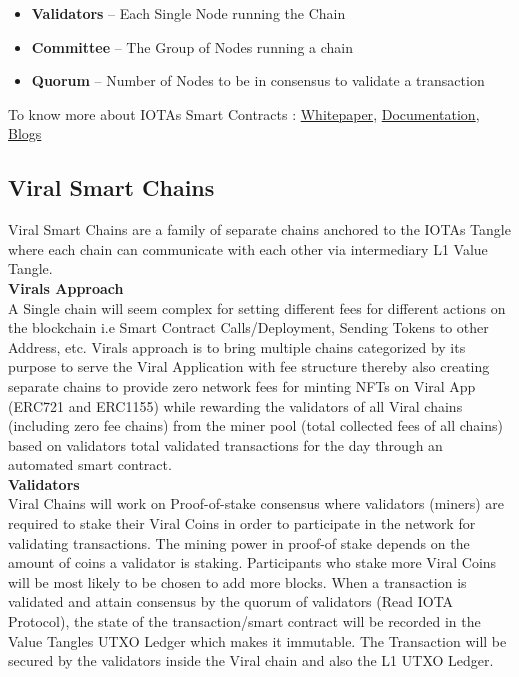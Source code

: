 \documentclass[10pt]{article}
\begin{document}
\begin{itemize}[leftmargin=+0.2in]
\item \textbf{Validators} – Each Single Node running the Chain
\item \textbf{Committee} – The Group of Nodes running a chain
\item \textbf{Quorum} – Number of Nodes to be in consensus to validate a transaction
\end{itemize}

To know more about IOTA\textsc{}s Smart Contracts : \hyperlink{https://files.iota.org/papers/ISC_WP_Nov_10_2021.pdf}{Whitepaper}, \hyperlink{https://wiki.iota.org/smart-contracts/overview}{Documentation}, \hyperlink{https://blog.iota.org/iota-smart-contracts-beta-release/}{Blogs}\\

\subsection{Viral Smart Chains}

Viral Smart Chains are a family of separate chains anchored to the IOTA\textsc{}s Tangle where each chain can communicate with each other via intermediary L1 Value Tangle.\\

\textbf{Viral\textsc{}s Approach}\\

A Single chain will seem complex for setting different fees for different actions on the blockchain i.e Smart Contract Calls/Deployment, Sending Tokens to other Address, etc. Viral\textsc{}s approach is to bring multiple chains categorized by its purpose to serve the Viral Application with fee structure thereby also creating separate chains to provide zero network fees for minting NFTs on Viral App (ERC721 and ERC1155) while rewarding the validators of all Viral chains (including zero fee chains) from the miner pool (total collected fees of all chains) based on validator\textsc{}s total validated transactions for the day through an automated smart contract.\\

\textbf{Validators}\\

Viral Chains will work on Proof-of-stake consensus where validators (miners) are required to stake their Viral Coins in order to participate in the network for validating transactions. The mining power in proof-of stake depends on the amount of coins a validator is staking. Participants who stake more Viral Coins will be most likely to be chosen to add more blocks. When a transaction is validated and attain consensus by the quorum of validators (Read IOTA Protocol), the state of the transaction/smart contract will be recorded in the Value Tangle\textsc{}s UTXO Ledger which makes it immutable. The Transaction will be secured by the validators inside the Viral chain and also the L1 UTXO Ledger.\\
\end{document}
